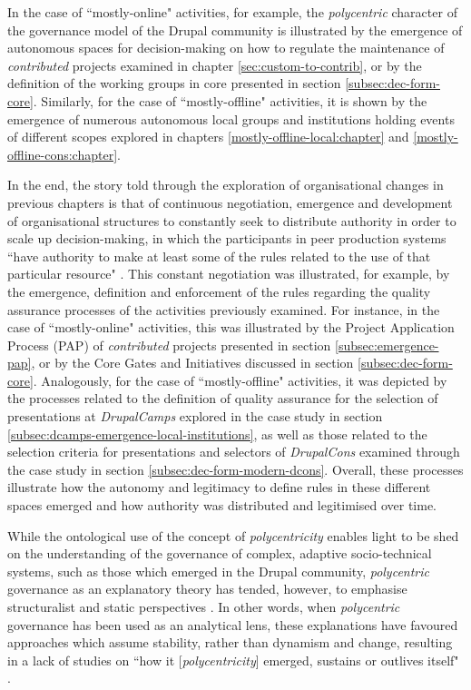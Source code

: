 In the case of ``mostly-online" activities, for example, the \textit{polycentric} character of the governance model of the Drupal community is illustrated by the emergence of autonomous spaces for decision-making on how to regulate the maintenance of \textit{contributed} projects examined in chapter \ref{sec:custom-to-contrib}, or by the definition of the working groups in core presented in section \ref{subsec:dec-form-core}. Similarly, for the case of ``mostly-offline" activities, it is shown by the emergence of numerous autonomous local groups and institutions holding events of different scopes explored in chapters \ref{mostly-offline-local:chapter} and \ref{mostly-offline-cons:chapter}.

In the end, the story told through the exploration of organisational changes in previous chapters is that of continuous negotiation, emergence and development of organisational structures to constantly seek to distribute authority in order to scale up decision-making, in which the participants in peer production systems  ``have authority to make at least some of the rules related to the use of that particular resource" \parencite[528]{ostrom1999coping}. This constant negotiation was illustrated, for example, by the emergence, definition and enforcement of the rules regarding the quality assurance processes of the activities previously examined. For instance, in the case of ``mostly-online" activities,  this was illustrated by the Project Application Process (PAP) of \textit{contributed} projects presented in section \ref{subsec:emergence-pap}, or by the Core Gates and Initiatives discussed in section \ref{subsec:dec-form-core}. Analogously, for the case of ``mostly-offline" activities, it was depicted by the processes related to the definition of quality assurance for the selection of presentations at \textit{DrupalCamps} explored in the case study in section \ref{subsec:dcamps-emergence-local-institutions}, as well as those related to the selection criteria for presentations and selectors of \textit{DrupalCons} examined through the case study in section \ref{subsec:dec-form-modern-dcons}. Overall, these processes illustrate how the autonomy and legitimacy to define rules in these different spaces emerged and how authority was distributed and legitimised over time.

While the ontological use of the concept of \textit{polycentricity} \parencite[13-15]{thiel2016polycentricity} enables light to be shed on the understanding of the governance of complex, adaptive socio-technical systems, such as those which emerged in the Drupal community, \textit{polycentric} governance as an explanatory theory has tended, however, to emphasise structuralist and static perspectives \parencite[8-9]{thiel2016polycentricity}. In other words, when \textit{polycentric} governance has been used as an analytical lens, these explanations have favoured approaches which assume stability, rather than dynamism and change, resulting in a lack of studies on  ``how it [\textit{polycentricity}] emerged, sustains or outlives itself" \parencite[7]{thiel2016polycentricity}.

